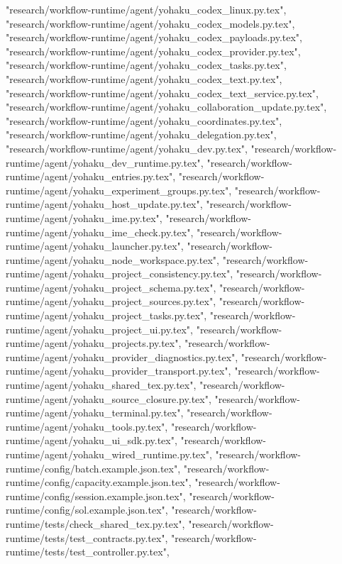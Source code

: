 {    "research/workflow-runtime/agent/yohaku_codex_linux.py.tex",
    "research/workflow-runtime/agent/yohaku_codex_models.py.tex",
    "research/workflow-runtime/agent/yohaku_codex_payloads.py.tex",
    "research/workflow-runtime/agent/yohaku_codex_provider.py.tex",
    "research/workflow-runtime/agent/yohaku_codex_tasks.py.tex",
    "research/workflow-runtime/agent/yohaku_codex_text.py.tex",
    "research/workflow-runtime/agent/yohaku_codex_text_service.py.tex",
    "research/workflow-runtime/agent/yohaku_collaboration_update.py.tex",
    "research/workflow-runtime/agent/yohaku_coordinates.py.tex",
    "research/workflow-runtime/agent/yohaku_delegation.py.tex",
    "research/workflow-runtime/agent/yohaku_dev.py.tex",
    "research/workflow-runtime/agent/yohaku_dev_runtime.py.tex",
    "research/workflow-runtime/agent/yohaku_entries.py.tex",
    "research/workflow-runtime/agent/yohaku_experiment_groups.py.tex",
    "research/workflow-runtime/agent/yohaku_host_update.py.tex",
    "research/workflow-runtime/agent/yohaku_ime.py.tex",
    "research/workflow-runtime/agent/yohaku_ime_check.py.tex",
    "research/workflow-runtime/agent/yohaku_launcher.py.tex",
    "research/workflow-runtime/agent/yohaku_node_workspace.py.tex",
    "research/workflow-runtime/agent/yohaku_project_consistency.py.tex",
    "research/workflow-runtime/agent/yohaku_project_schema.py.tex",
    "research/workflow-runtime/agent/yohaku_project_sources.py.tex",
    "research/workflow-runtime/agent/yohaku_project_tasks.py.tex",
    "research/workflow-runtime/agent/yohaku_project_ui.py.tex",
    "research/workflow-runtime/agent/yohaku_projects.py.tex",
    "research/workflow-runtime/agent/yohaku_provider_diagnostics.py.tex",
    "research/workflow-runtime/agent/yohaku_provider_transport.py.tex",
    "research/workflow-runtime/agent/yohaku_shared_tex.py.tex",
    "research/workflow-runtime/agent/yohaku_source_closure.py.tex",
    "research/workflow-runtime/agent/yohaku_terminal.py.tex",
    "research/workflow-runtime/agent/yohaku_tools.py.tex",
    "research/workflow-runtime/agent/yohaku_ui_sdk.py.tex",
    "research/workflow-runtime/agent/yohaku_wired_runtime.py.tex",
    "research/workflow-runtime/config/batch.example.json.tex",
    "research/workflow-runtime/config/capacity.example.json.tex",
    "research/workflow-runtime/config/session.example.json.tex",
    "research/workflow-runtime/config/sol.example.json.tex",
    "research/workflow-runtime/tests/check_shared_tex.py.tex",
    "research/workflow-runtime/tests/test_contracts.py.tex",
    "research/workflow-runtime/tests/test_controller.py.tex",
}

